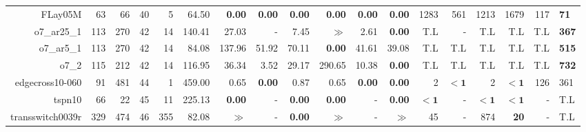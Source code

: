 \begin{table*}[t]
\begin{tabular}{|r|r|r|r|r||r||r|r|r|r|r||r|r|r|r|r|r|}
                           FLay05M &           63 &            66 &           40 &             5 &               64.50 &  \textbf{0.00} &  \textbf{0.00} &  \textbf{0.00} &  \textbf{0.00} &  \textbf{0.00} &  \textbf{0.00} &               1283 &                561 &               1213 &               1679 &          117 &  \textbf{71} \\ 
                       o7\_ar25\_1 &          113 &           270 &           42 &            14 &              140.41 &          27.03 &              - &           7.45 &          $\gg$ &           2.61 &  \textbf{0.00} &                T.L &                  - &                T.L &                T.L &          T.L & \textbf{367} \\ 
                        o7\_ar5\_1 &          113 &           270 &           42 &            14 &               84.08 &         137.96 &          51.92 &          70.11 &  \textbf{0.00} &          41.61 &          39.08 &                T.L &                T.L &                T.L &                T.L &          T.L & \textbf{515} \\ 
                             o7\_2 &          115 &           212 &           42 &            14 &              116.95 &          36.34 &           3.52 &          29.17 &         290.65 &          10.38 &  \textbf{0.00} &                T.L &                T.L &                T.L &                T.L &          T.L & \textbf{732} \\ 
                   edgecross10-060 &           91 &           481 &           44 &             1 &              459.00 &           0.65 &  \textbf{0.00} &           0.87 &           0.65 &  \textbf{0.00} &  \textbf{0.00} &                  2 &         $\bm{< 1}$ &                  2 &         $\bm{< 1}$ &          126 &          361 \\ 
                            tspn10 &           66 &            22 &           45 &            11 &              225.13 &  \textbf{0.00} &              - &  \textbf{0.00} &  \textbf{0.00} &              - &  \textbf{0.00} &         $\bm{< 1}$ &                  - &         $\bm{< 1}$ &         $\bm{< 1}$ &            - &          T.L \\ 
                  transswitch0039r &          329 &           474 &           46 &           355 &               82.08 &          $\gg$ &              - &  \textbf{0.00} &          $\gg$ &              - &          $\gg$ &                 45 &                  - &                874 &        \textbf{20} &            - &          T.L \\ 

\end{tabular}
\end{table*}
